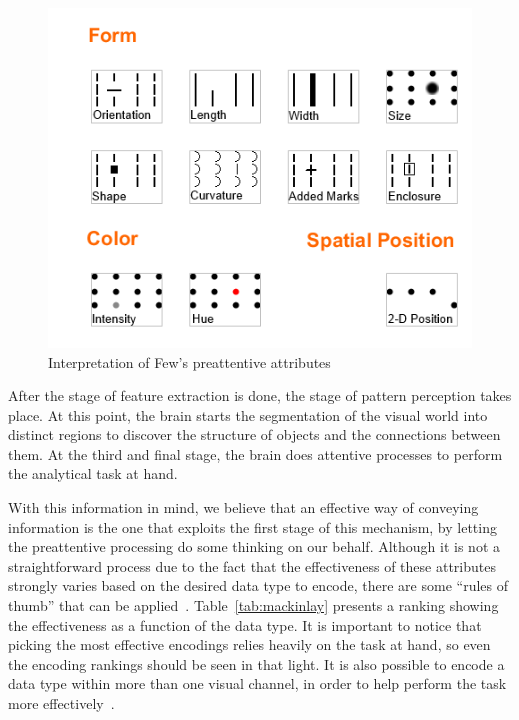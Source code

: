 \begin{figure}[h!]
\centering
\includegraphics[width=1\textwidth]{figures/ali-encodings}
\caption{Interpretation of Few's preattentive attributes\cite{few2006information}}
\label{fig:preattentive}
\end{figure}

After the stage of feature extraction is done, the stage of pattern perception
takes place. At this point, the brain starts the segmentation of the visual
world into distinct regions to discover the structure of objects and the
connections between them. At the third and final stage, the brain does attentive
processes to perform the analytical task at hand.

With this information in mind, we believe that an effective way of conveying
information is the one that exploits the first stage of this mechanism, by
letting the preattentive processing do some thinking on our behalf.
Although it is not a straightforward process due to the fact that the
effectiveness of these attributes strongly varies based on the desired data type
to encode, there are some ``rules of thumb'' that can be
applied~\cite{mackinlay1986automating}.
Table~\ref{tab:mackinlay} presents a ranking showing the effectiveness as a
function of the data type. It is important to notice that picking the most
effective encodings relies heavily on the task at hand, so even the encoding
rankings should be seen in that light. It is also possible to encode a data type
within more than one visual channel, in order to help perform the task more
effectively~\cite{thoughtworks2012thoughtworks}.

